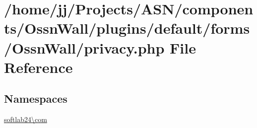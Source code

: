 \hypertarget{components_2_ossn_wall_2plugins_2default_2forms_2_ossn_wall_2privacy_8php}{}\section{/home/jj/\+Projects/\+A\+S\+N/components/\+Ossn\+Wall/plugins/default/forms/\+Ossn\+Wall/privacy.php File Reference}
\label{components_2_ossn_wall_2plugins_2default_2forms_2_ossn_wall_2privacy_8php}
\subsection*{Namespaces}
\begin{DoxyCompactItemize}
\item 
 \hyperlink{namespacesoftlab24_1_1com}{softlab24\textbackslash{}com}
\end{DoxyCompactItemize}
